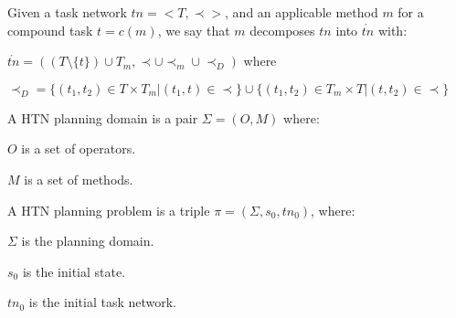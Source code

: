 \begin{Tdef}[Decomposition]
   Given a task network $tn=<T, \prec>$, and an applicable method $m$ for a compound task $t= c(m)$, we say that $m$ decomposes $tn$ into $\acute{tn}$ with:
   \vspace{-0.5em}
    \begin{compactitem}
    \item 
    $\acute{tn} = ((T \setminus\{ t \}) \cup T_m, \prec \cup \prec_m \cup \prec_D) $ where 
    \item 
    $\prec_D = \{ (t_1, t_2) \in T \times T_m | (t_1, t) \in  \prec\} \cup \{ (t_1, t_2) \in T_m \times T | (t, t_2) \in  \prec\}$ 
    \end{compactitem}
\end{Tdef}


\begin{Tdef}
    A  HTN planning domain is a pair $\Sigma= (O, M)$ where:
    \vspace{-0.5em}
    \begin{compactitem}
    \item 
    $O$ is a set of operators.
    \item 
    $M$ is a set of methods.
    \end{compactitem}
\end{Tdef}

\begin{Tdef}
    A HTN planning problem is a triple $\pi = (\Sigma,s_0,tn_0)$, where:
    \vspace{-0.5em}
    \begin{compactitem}
    \item 
    $\Sigma$ is the planning domain.
    \item 
    $s_0$ is the initial state.
    \item 
    $tn_0$ is the initial task network.
    \end{compactitem}
\end{Tdef}

